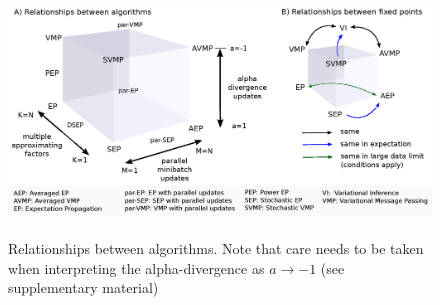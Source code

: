 
\begin{figure}
\centering
\def\svgwidth{1\linewidth}
\includegraphics[height=6.5cm]{fig/relationship-algorithms.eps}%
\caption{Relationships between algorithms. Note that care needs to be taken when interpreting the alpha-divergence as $a \rightarrow -1$ (see supplementary material)}
\end{figure}

